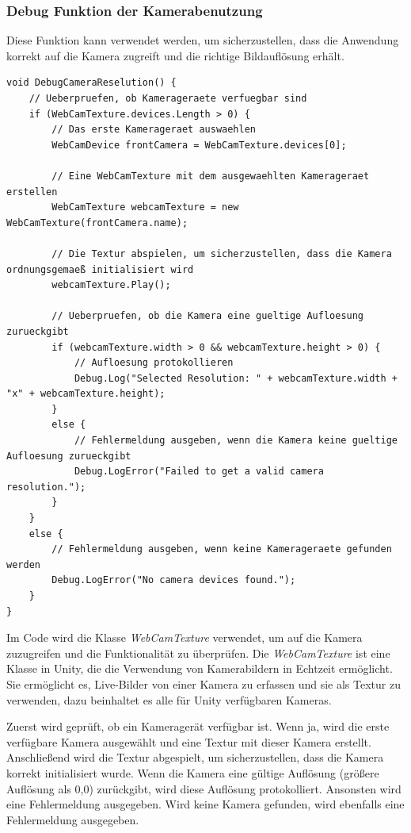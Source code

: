\subsubsection{Debug Funktion der Kamerabenutzung}
Diese Funktion kann verwendet werden, um sicherzustellen, dass die Anwendung korrekt auf die Kamera zugreift und die richtige Bildauflösung erhält.
\begin{lstlisting}[style=csharp, caption={Debug Funktion von der Kamera Benutzung}, label=code:debugRaycast]
void DebugCameraReselution() {
    // Ueberpruefen, ob Kamerageraete verfuegbar sind
    if (WebCamTexture.devices.Length > 0) {
        // Das erste Kamerageraet auswaehlen
        WebCamDevice frontCamera = WebCamTexture.devices[0];

        // Eine WebCamTexture mit dem ausgewaehlten Kamerageraet erstellen
        WebCamTexture webcamTexture = new WebCamTexture(frontCamera.name);

        // Die Textur abspielen, um sicherzustellen, dass die Kamera ordnungsgemaeß initialisiert wird
        webcamTexture.Play();

        // Ueberpruefen, ob die Kamera eine gueltige Aufloesung zurueckgibt
        if (webcamTexture.width > 0 && webcamTexture.height > 0) {
            // Aufloesung protokollieren
            Debug.Log("Selected Resolution: " + webcamTexture.width + "x" + webcamTexture.height);
        }
        else {
            // Fehlermeldung ausgeben, wenn die Kamera keine gueltige Aufloesung zurueckgibt
            Debug.LogError("Failed to get a valid camera resolution.");
        }
    }
    else {
        // Fehlermeldung ausgeben, wenn keine Kamerageraete gefunden  werden
        Debug.LogError("No camera devices found.");
    }
}
\end{lstlisting}
Im Code wird die Klasse \textit{WebCamTexture} verwendet, um auf die Kamera zuzugreifen und die Funktionalität zu überprüfen. Die \textit{WebCamTexture} ist eine Klasse in Unity, die die Verwendung von Kamerabildern in Echtzeit ermöglicht. Sie ermöglicht es, Live-Bilder von einer Kamera zu erfassen und sie als Textur zu verwenden, dazu beinhaltet es alle für Unity verfügbaren Kameras.

Zuerst wird geprüft, ob ein Kameragerät verfügbar ist. Wenn ja, wird die erste verfügbare Kamera ausgewählt und eine Textur mit dieser Kamera erstellt. Anschließend wird die Textur abgespielt, um sicherzustellen, dass die Kamera korrekt initialisiert wurde. Wenn die Kamera eine gültige Auflösung (größere Auflösung als 0,0) zurückgibt, wird diese Auflösung protokolliert. Ansonsten wird eine Fehlermeldung ausgegeben. Wird keine Kamera gefunden, wird ebenfalls eine Fehlermeldung ausgegeben.



